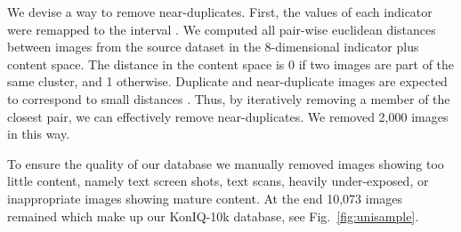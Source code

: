 \documentclass{article}
\begin{document}
We devise a way to remove near-duplicates. First, the values of each indicator were remapped to the interval . We computed all pair-wise euclidean distances  between images  from the source dataset in the 8-dimensional indicator plus content space. The distance in the content space is 0 if two images are part of the same cluster, and 1 otherwise. Duplicate and near-duplicate images  are expected to correspond to small distances . Thus, by iteratively removing a member of the closest pair, we can effectively remove near-duplicates. We removed 2,000 images in this way. 






To ensure the quality of our database we manually removed images showing too little content, namely text screen shots, text scans, heavily under-exposed, or inappropriate images showing mature content. At the end 10,073 images remained which make up our KonIQ-10k database, see Fig.~\ref{fig:unisample}.
\end{document}
